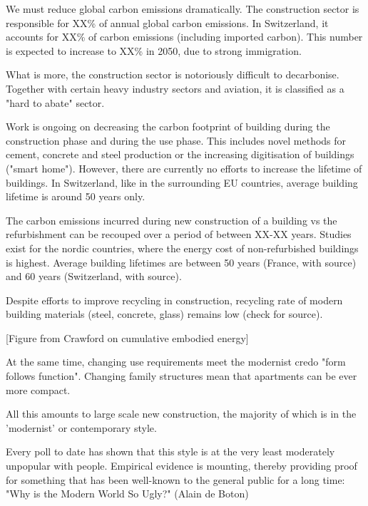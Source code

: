 \documentclass{article}
\begin{document}
\begin{minipage}{0.55\textwidth}

    We must reduce global carbon emissions dramatically. The construction sector is responsible for XX\% of annual global carbon emissions. In Switzerland, it accounts for XX\% of carbon emissions (including imported carbon). This number is expected to increase to XX\% in 2050, due to strong immigration.
    
    What is more, the construction sector is notoriously difficult to decarbonise. Together with certain heavy industry sectors and aviation, it is classified as a "hard to abate" sector.
    
    Work is ongoing on decreasing the carbon footprint of building during the construction phase and during the use phase. This includes novel methods for cement, concrete and steel production or the increasing digitisation of buildings ("smart home"). However, there are currently no efforts to increase the lifetime of buildings. In Switzerland, like in the surrounding EU countries, average building lifetime is around 50 years only.
    
    The carbon emissions incurred during new construction of a building vs the refurbishment can be recouped over a period of between XX-XX years. Studies exist for the nordic countries, where the energy cost of non-refurbished buildings is highest. Average building lifetimes are between 50 years (France, with source) and 60 years (Switzerland, with source).
    
    Despite efforts to improve recycling in construction, recycling rate of modern building materials (steel, concrete, glass) remains low (check for source).
    
    [Figure from Crawford on cumulative embodied energy]
    
    At the same time, changing use requirements meet the modernist credo "form follows function". Changing family structures mean that apartments can be ever more compact.
    
    All this amounts to large scale new construction, the majority of which is in the 'modernist' or contemporary style.
    
    Every poll to date has shown that this style is at the very least moderately unpopular with people. Empirical evidence is mounting, thereby providing proof for something that has been well-known to the general public for a long time: "Why is the Modern World So Ugly?" (Alain de Boton)

\end{minipage}\hspace{15mm}
\end{document}
